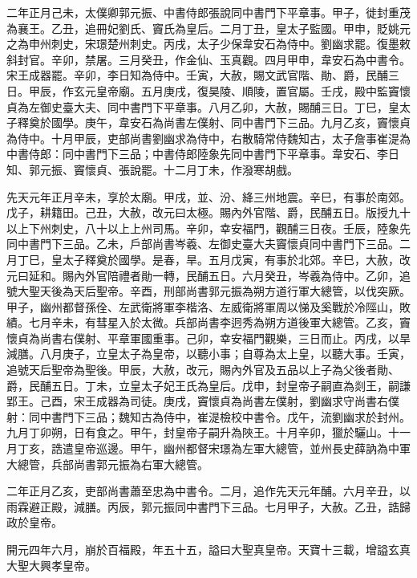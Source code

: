 \begin{pinyinscope}
 二年正月己未，太僕卿郭元振、中書侍郎張說同中書門下平章事。甲子，徙封重茂為襄王。乙丑，追冊妃劉氏、竇氏為皇后。二月丁丑，皇太子監國。甲申，貶姚元之為申州刺史，宋璟楚州刺史。丙戌，太子少保韋安石為侍中。劉幽求罷。復墨敕斜封官。辛卯，禁屠。三月癸丑，作金仙、玉真觀。四月甲申，韋安石為中書令。宋王成器罷。辛卯，李日知為侍中。壬寅，大赦，賜文武官階、勛、爵，民酺三日。甲辰，作玄元皇帝廟。五月庚戌，復昊陵、順陵，置官屬。壬戌，殿中監竇懷貞為左御史臺大夫、同中書門下平章事。八月乙卯，大赦，賜酺三日。丁巳，皇太子釋奠於國學。庚午，韋安石為尚書左僕射、同中書門下三品。九月乙亥，竇懷貞為侍中。十月甲辰，吏部尚書劉幽求為侍中，右散騎常侍魏知古，太子詹事崔湜為中書侍郎：同中書門下三品；中書侍郎陸象先同中書門下平章事。韋安石、李日知、郭元振、竇懷貞、張說罷。十二月丁未，作潑寒胡戲。



 先天元年正月辛未，享於太廟。甲戌，並、汾、絳三州地震。辛巳，有事於南郊。戊子，耕籍田。己丑，大赦，改元曰太極。賜內外官階、爵，民酺五日。版授九十以上下州刺史，八十以上上州司馬。辛卯，幸安福門，觀酺三日夜。壬辰，陸象先同中書門下三品。乙未，戶部尚書岑羲、左御史臺大夫竇懷貞同中書門下三品。二月丁巳，皇太子釋奠於國學。是春，旱。五月戊寅，有事於北郊。辛巳，大赦，改元曰延和。賜內外官陪禮者勛一轉，民酺五日。六月癸丑，岑羲為侍中。乙卯，追號大聖天後為天后聖帝。辛酉，刑部尚書郭元振為朔方道行軍大總管，以伐突厥。甲子，幽州都督孫佺、左武衛將軍李楷洛、左威衛將軍周以悌及奚戰於冷陘山，敗績。七月辛未，有彗星入於太微。兵部尚書李迥秀為朔方道後軍大總管。乙亥，竇懷貞為尚書右僕射、平章軍國重事。己卯，幸安福門觀樂，三日而止。丙戌，以旱減膳。八月庚子，立皇太子為皇帝，以聽小事；自尊為太上皇，以聽大事。壬寅，追號天后聖帝為聖後。甲辰，大赦，改元，賜內外官及五品以上子為父後者勛、爵，民酺五日。丁未，立皇太子妃王氏為皇后。戊申，封皇帝子嗣直為剡王，嗣謙郢王。己酉，宋王成器為司徒。庚戌，竇懷貞為尚書左僕射，劉幽求守尚書右僕射：同中書門下三品；魏知古為侍中，崔湜檢校中書令。戊午，流劉幽求於封州。九月丁卯朔，日有食之。甲午，封皇帝子嗣升為陜王。十月辛卯，獵於驪山。十一月丁亥，誥遣皇帝巡邊。甲午，幽州都督宋璟為左軍大總管，並州長史薛訥為中軍大總管，兵部尚書郭元振為右軍大總管。



 二年正月乙亥，吏部尚書蕭至忠為中書令。二月，追作先天元年酺。六月辛丑，以雨霖避正殿，減膳。丙辰，郭元振同中書門下三品。七月甲子，大赦。乙丑，誥歸政於皇帝。



 開元四年六月，崩於百福殿，年五十五，謚曰大聖真皇帝。天寶十三載，增謚玄真大聖大興孝皇帝。




\end{pinyinscope}
